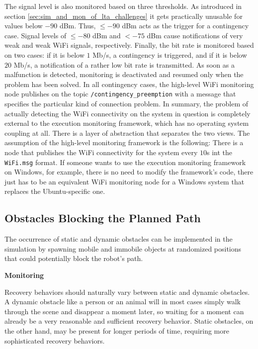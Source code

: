 \documentclass[english, master, utf8]{base/thesis_KBS}
\newcommand{\code}[1]{\colorbox{light-gray}{\texttt{#1}}}
\begin{document}
The signal level is also monitored based on three thresholds. As introduced in section \ref{sec:sim_and_mon_of_lta_challenges} it gets practically unusable for values below
$-90$ dBm. Thus, $\leq -90$ dBm acts as the trigger for a contingency case. Signal levels of $\leq -80$ dBm and $< -75$ dBm cause notifications of very weak and weak WiFi signals,
respectively. Finally, the bit rate is monitored based on two cases: if it is below $1$ Mb/s, a contingency is triggered, and if it is below $20$ Mb/s, a notification of a
rather low bit rate is transmitted. As soon as a malfunction is detected, monitoring is deactivated and resumed only when the problem has been solved. In all contingency
cases, the high-level WiFi monitoring node publishes on the topic \code{/contingency\_preemption} with a message that specifies the particular kind of connection problem.\newline
In summary, the problem of actually detecting the WiFi connectivity on the system in question is completely external to the execution monitoring framework,
which has no operating system coupling at all. There is a layer of abstraction that separates the two views. The assumption of the high-level monitoring framework is the
following: There is a node that publishes the WiFi connectivity for the system every $10$s int the \code{WiFi.msg} format. If someone wants to use the execution monitoring
framework on Windows, for example, there is no need to modify the framework's code, there just has to be an equivalent WiFi monitoring node for a Windows system that replaces
the Ubuntu-specific one.

\subsection{Obstacles Blocking the Planned Path}
\label{sec:sim_and_mon_obstacles}

The occurrence of static and dynamic obstacles can be implemented in the simulation by spawning mobile and immobile objects at randomized 
positions that could potentially block the robot's path.\newline

\noindent
\textbf{Monitoring}\newline

\noindent
Recovery behaviors should naturally vary between static and dynamic obstacles. A dynamic obstacle like a person or an animal will in most cases 
simply walk through the scene and disappear a moment later, so waiting for a moment can already be a very reasonable and sufficient recovery behavior. 
Static obstacles, on the other hand, may be present for longer  periods of time, requiring more sophisticated recovery behaviors.
\end{document}
